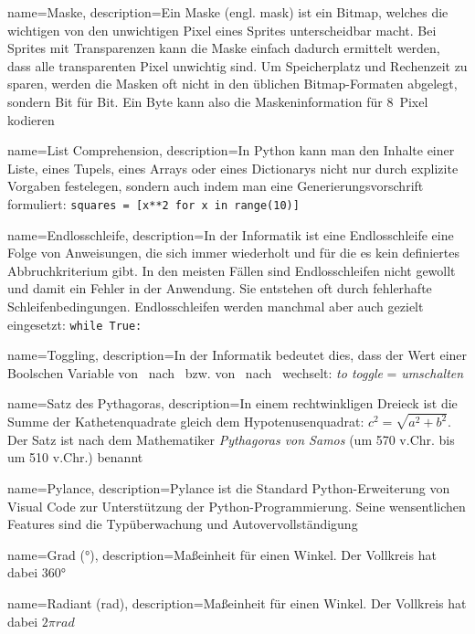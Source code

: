 {
	name={Maske},
	description={Ein Maske (engl. mask) ist ein Bitmap, welches die wichtigen von den unwichtigen Pixel eines Sprites unterscheidbar macht. Bei Sprites mit Transparenzen kann die Maske einfach dadurch ermittelt werden, dass alle transparenten Pixel unwichtig sind. Um Speicherplatz und Rechenzeit zu sparen, werden die Masken oft nicht in den üblichen Bitmap-Formaten abgelegt, sondern Bit für Bit. Ein Byte kann also die Maskeninformation für 8~Pixel kodieren} 
}

{
	name={List Comprehension},
	description={In Python kann man den Inhalte einer Liste, eines Tupels, eines Arrays oder eines Dictionarys nicht nur durch explizite Vorgaben festelegen, sondern auch indem man eine Generierungsvorschrift formuliert: \texttt{squares = [x**2 for x in range(10)]}} 
}

{
	name={Endlosschleife},
	description={In der Informatik ist eine Endlosschleife eine Folge von Anweisungen, die sich immer wiederholt und für die es kein definiertes Abbruchkriterium gibt. In den meisten Fällen sind Endlosschleifen nicht gewollt und damit ein Fehler in der Anwendung. Sie entstehen oft durch fehlerhafte Schleifenbedingungen. Endlosschleifen werden manchmal aber auch gezielt eingesetzt: \texttt{while True:}} 
}

{
	name={Toggling},
	description={In der Informatik bedeutet dies, dass der Wert einer Boolschen Variable von \true\ nach \false\ bzw. von \false\ nach \true\ wechselt: \emph{to toggle} = \emph{umschalten}} 
}

{
	name={Satz des Pythagoras},
	description={In einem rechtwinkligen Dreieck ist die Summe der Kathetenquadrate gleich dem Hypotenusenquadrat: $c^2 = \sqrt{a^2 + b^2}$. Der Satz ist nach dem Mathematiker \emph{Pythagoras von Samos} (um 570 v.Chr. bis um 510 v.Chr.) benannt} 
}

{
	name={Pylance},
	description={Pylance ist die Standard Python-Erweiterung von Visual Code zur Unterstützung der Python-Programmierung. Seine wensentlichen Features sind die Typüberwachung und Autovervollständigung} 
}

{
	name={Grad (°)},
	description={Maßeinheit für einen Winkel. Der Vollkreis hat dabei $360°$} 
}

{
	name={Radiant (rad)},
	description={Maßeinheit für einen Winkel. Der Vollkreis hat dabei $2\pi rad$} 
}

